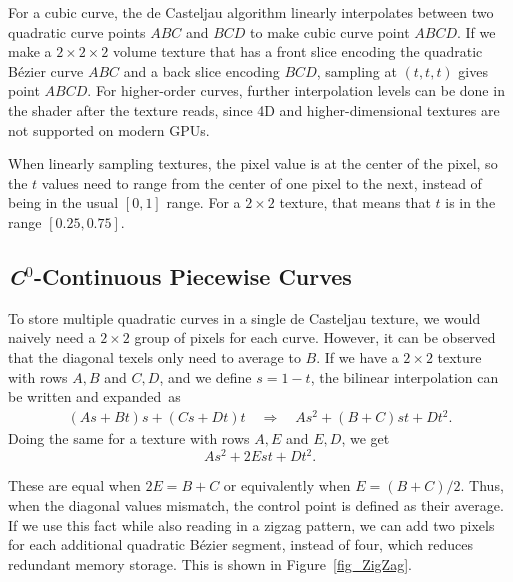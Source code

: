 \documentclass{jcgt}
\begin{document}


For a cubic curve, the de Casteljau algorithm linearly interpolates between two quadratic curve points $ABC$ and $BCD$ to make cubic curve point $ABCD$. If we make a $2 \times 2 \times 2$ volume
texture that has a front slice encoding the quadratic Bézier curve $ABC$ and a back slice encoding $BCD$, sampling at $(t,t,t)$ gives point $ABCD$. For higher-order curves, further
interpolation levels can be done in the shader after the texture reads, since 4D and higher-dimensional textures are not supported on modern GPUs.

When linearly sampling textures, the pixel value is at the center of the pixel, so the $t$ values need to range from the center of one pixel to the next, instead of being in the usual
$[0,1]$ range. For a $2 \times 2$ texture, that means that $t$ is in the range $[0.25, 0.75]$.

\subsection{\textit{C}$^\text{0}$-Continuous Piecewise Curves}


To store multiple quadratic curves in a single de Casteljau texture, we would naively need a $2 \times 2$ group of pixels for each curve. However, it can be observed that the diagonal texels
only need to average to $B$. If we have a $2 \times 2$ texture with rows $A, B$ and $C, D$, and we define $s = 1 - t$, the bilinear interpolation can be written and expanded~as
\begin{equation}
\begin{split}
(As + Bt)s + (Cs + Dt)t \quad \Rightarrow \quad As^2 + (B+C)st + Dt^2 .
\end{split}
\end{equation}
Doing the same for a texture with rows $A, E$ and $E, D$, we get
\begin{equation}
As^2 + 2Est + Dt^2 .
\end{equation}

These are equal when $2E = B+C$ or equivalently when $E = (B+C)/2$.  Thus, when the diagonal values mismatch, the control point is defined as their average. If we use this fact
while also reading in a zigzag pattern, we can add two pixels for each additional quadratic Bézier segment, instead of four, which reduces redundant memory storage. This is shown in Figure~\ref{fig_ZigZag}.
\end{document}
